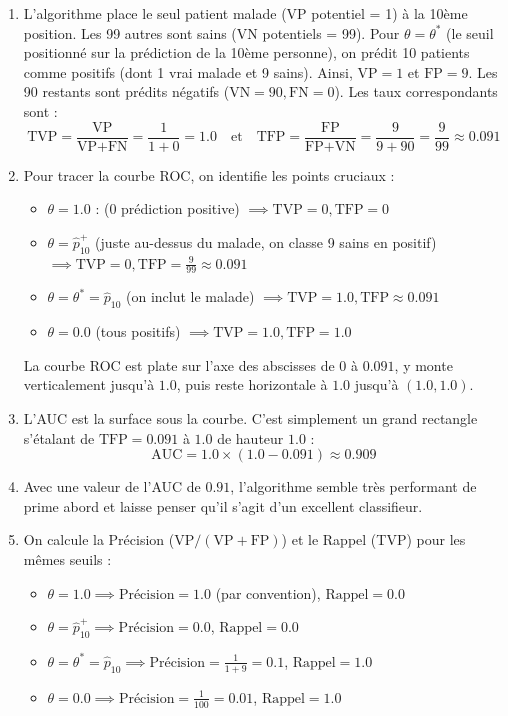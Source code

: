 \documentclass[]{../exercices}
\begin{document}
\begin{solution}
	\begin{enumerate}
		\item L'algorithme place le seul patient malade (VP potentiel = 1) à la 10ème position. Les 99 autres sont sains (VN potentiels = 99).
		Pour $\theta = \theta^*$ (le seuil positionné sur la prédiction de la 10ème personne), on prédit 10 patients comme positifs (dont 1 vrai malade et 9 sains).
		Ainsi, $\text{VP} = 1$ et $\text{FP} = 9$. Les 90 restants sont prédits négatifs ($\text{VN} = 90, \text{FN} = 0$).
		Les taux correspondants sont :
		\[
		\text{TVP} = \frac{\text{VP}}{\text{VP} + \text{FN}} = \frac{1}{1 + 0} = 1.0 \quad \text{et} \quad \text{TFP} = \frac{\text{FP}}{\text{FP} + \text{VN}} = \frac{9}{9 + 90} = \frac{9}{99} \approx 0.091
		\]

		\item Pour tracer la courbe ROC, on identifie les points cruciaux :
		\begin{itemize}
			\item $\theta = 1.0$ : (0 prédiction positive) $\implies \text{TVP} = 0, \text{TFP} = 0$
			\item $\theta = \hat{p}_{10}^+$ (juste au-dessus du malade, on classe 9 sains en positif) $\implies \text{TVP} = 0, \text{TFP} = \frac{9}{99} \approx 0.091$
			\item $\theta = \theta^* = \hat{p}_{10}$ (on inclut le malade) $\implies \text{TVP} = 1.0, \text{TFP} \approx 0.091$
			\item $\theta = 0.0$ (tous positifs) $\implies \text{TVP} = 1.0, \text{TFP} = 1.0$
		\end{itemize}
		La courbe ROC est plate sur l'axe des abscisses de $0$ à $0.091$, y monte verticalement jusqu'à $1.0$, puis reste horizontale à $1.0$ jusqu'à $(1.0, 1.0)$.

		\item L'AUC est la surface sous la courbe. C'est simplement un grand rectangle s'étalant de $\text{TFP} = 0.091$ à $1.0$ de hauteur $1.0$ :
		\[
		\text{AUC} = 1.0 \times (1.0 - 0.091) \approx 0.909
		\]

		\item Avec une valeur de l'AUC de $0.91$, l'algorithme semble très performant de prime abord et laisse penser qu'il s'agit d'un excellent classifieur.

		\item On calcule la Précision ($\text{VP} / (\text{VP} + \text{FP})$) et le Rappel (TVP) pour les mêmes seuils :
		\begin{itemize}
			\item $\theta = 1.0 \implies \text{Précision} = 1.0$ (par convention), $\text{Rappel} = 0.0$
			\item $\theta = \hat{p}_{10}^+ \implies \text{Précision} = 0.0$, $\text{Rappel} = 0.0$
			\item $\theta = \theta^* = \hat{p}_{10} \implies \text{Précision} = \frac{1}{1 + 9} = 0.1$, $\text{Rappel} = 1.0$
			\item $\theta = 0.0 \implies \text{Précision} = \frac{1}{100} = 0.01$, $\text{Rappel} = 1.0$
		\end{itemize}


\end{enumerate}
\end{solution}
\end{document}
